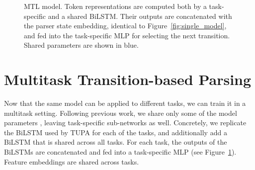 \documentclass[11pt,a4paper]{article}
\begin{document}
\begin{figure}[t]
   \caption{MTL model.
      Token representations are computed both by a task-specific and a shared BiLSTM.
      Their outputs are concatenated with the parser state embedding,
      identical to Figure~\ref{fig:single_model},
      and fed into the task-specific MLP for selecting the next transition.
      Shared parameters are shown in blue.
      }
   \label{fig:multi_model}
\end{figure}


\section{Multitask Transition-based Parsing}\label{sec:multitask}

Now that the same model can be applied to different tasks, 
we can train it in a multitask setting.
Following previous work, we share only some of the model parameters
\cite{N16-1179,P16-2038,C16-1013,C16-1059,C16-1179,E17-1005,P17-1186}, leaving task-specific
sub-networks as well.
Concretely, we replicate the BiLSTM used by TUPA for each of the tasks, and additionally add
a BiLSTM that is shared across all tasks. 
For each task, the outputs of the BiLSTMs are concatenated and
fed into a task-specific MLP (see Figure~\ref{fig:multi_model}).
Feature embeddings are shared across tasks.
\end{document}
